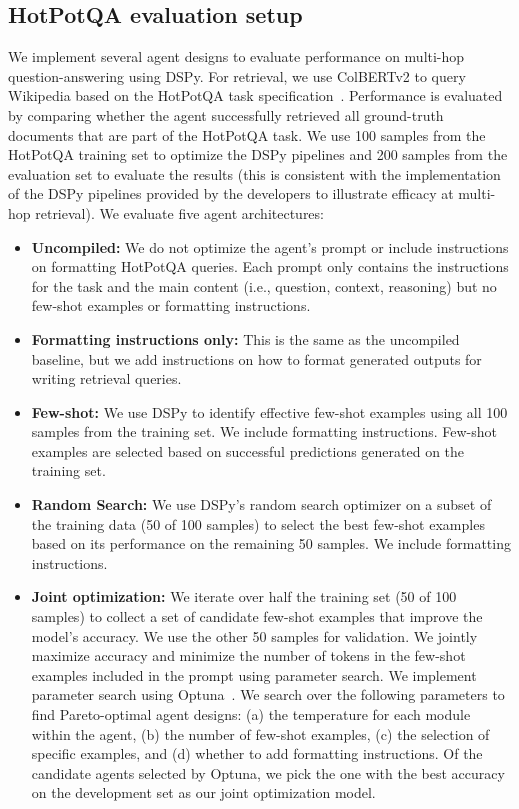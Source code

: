 \documentclass{article}
\begin{document}
\subsection{HotPotQA evaluation setup}

We implement several agent designs to evaluate performance on multi-hop question-answering using DSPy. For retrieval, we use ColBERTv2 to query Wikipedia based on the HotPotQA task specification~\citep{yang_hotpotqa_2018}. Performance is evaluated by comparing whether the agent successfully retrieved all ground-truth documents that are part of the HotPotQA task. We use 100 samples from the HotPotQA training set to optimize the DSPy pipelines and 200 samples from the evaluation set to evaluate the results (this is consistent with the implementation of the DSPy pipelines provided by the developers to illustrate efficacy at multi-hop retrieval). 
We evaluate five agent architectures:
\begin{itemize}[leftmargin=*]
    
    \item \textbf{Uncompiled:} We do not optimize the agent's prompt or include instructions on formatting HotPotQA queries. Each prompt only contains the instructions for the task and the main content (i.e., question, context, reasoning) but no few-shot examples or formatting instructions.
    \item \textbf{Formatting instructions only:} This is the same as the uncompiled baseline, but we add instructions on how to format generated outputs for writing retrieval queries. 
    \item \textbf{Few-shot:} We use DSPy to identify effective few-shot examples using all 100 samples from the training set. We include formatting instructions. Few-shot examples are selected based on successful predictions generated on the training set.
    \item \textbf{Random Search:} We use DSPy's random search optimizer on a subset of the training data (50 of 100 samples) to select the best few-shot examples based on its performance on the remaining 50 samples. We include formatting instructions.
    \item \textbf{Joint optimization:} 
    We iterate over half the training set (50 of 100 samples) to collect a set of candidate few-shot examples that improve the model's accuracy. We use the other 50 samples for validation. 
    We jointly maximize accuracy and minimize the number of tokens in the few-shot examples included in the prompt using parameter search.
    We implement parameter search using Optuna~\citep{akiba_optuna_2019}. We search over the following parameters to find Pareto-optimal agent designs: (a) the temperature for each module within the agent, (b) the number of few-shot examples, (c) the selection of specific examples, and (d) whether to add formatting instructions. Of the candidate agents selected by Optuna, we pick the one with the best accuracy on the development set as our joint optimization model. 
\end{itemize}
\end{document}
